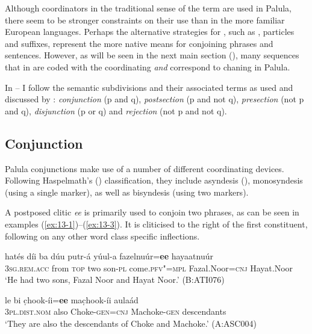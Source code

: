 Although coordinators in the traditional sense of the term are used in Palula, there seem to be stronger constraints on their use than in the more familiar European languages. Perhaps the alternative strategies for , such as ,  particles and suffixes, represent the more native means for conjoining phrases and sentences. However, as will be seen in the next main section (), many sequences that in \iliEnglish are coded with the coordinating  \textit{and} correspond to  chaning in Palula.



In -- I follow the semantic subdivisions and their associated terms as used and discussed by \citet{payne1985}: \textit{conjunction} (p and q), \textit{postsection} (p and not q), \textit{presection} (not p and q), \textit{disjunction} (p or q) and \textit{rejection} (not p and not q).


\subsection{Conjunction}
\label{subsec:13-2-1}

Palula conjunctions make use of a number of different coordinating devices. Following Haspelmath's (\citeyear{haspelmath2007}) classification, they include asyndesis (), monosyndesis (using a single marker), as well as bisyndesis (using two markers).

 A postposed  clitic \textit{ee} is primarily used to conjoin two  phrases, as can be seen in examples (\ref{ex:13-1})--(\ref{ex:13-3}). It is cliticised to the right of the first constituent, following on any other word class specific inflections.

\ea
\label{ex:13-1}
\gll hatés díi ba dúu putr-á yúul-a {\ob}fazelnuúr=\textbf{ee} hayaatnuúr{\cb}\\
\textsc{3sg.rem.acc} from \textsc{top} two son-\textsc{pl} come.\textsc{pfv"=mpl} Fazal.Noor=\textsc{cnj} Hayat.Noor\\
\glt `He had two sons, Fazal Noor and Hayat Noor.' (B:ATI076) 

\ex
\label{ex:13-2}
\gll le bi {\ob}c̣hook-íi=\textbf{ee} mac̣hook-íi{\cb} aulaád \\
\textsc{3pl.dist.nom} also Choke-\textsc{gen=cnj} Machoke-\textsc{gen} descendants\\
\glt `They are also the descendants of Choke and Machoke.' (A:ASC004)

